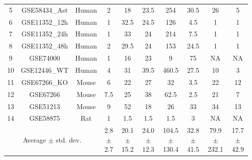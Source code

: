 \documentclass[Minh_PhD_thesis.tex]{subfiles}
\begin{document}
\begin{table}
\begin{center}
\begin{tabular}{ ccc|ccccccc }
5	& GSE58434\_Ast& Human &	\cellcolor{green}2	&	18	&	23.5	&	254	&	30.5	&	26 & 5\\ 

6	& GSE11352\_12h & Human	&	\cellcolor{green}1	&	32.5	&	24.5	&	126	&	4.5	&	\cellcolor{green}1 & \cellcolor{green}1\\ 

7	& GSE11352\_24h & Human	&	\cellcolor{green}1	&	33	&	24	&	214	&	7.5	&	\cellcolor{green}1 & \cellcolor{green}1\\ 

8	& GSE11352\_48h & Human	&	2	&	29.5	&	24	&	153	&	24.5	&	\cellcolor{green}1 & \cellcolor{green}1\\ 

9	& GSE74000 & Human	&	\cellcolor{green}1	&	16	&	23	&	9	&	75	&	\cellcolor{red}NA & \cellcolor{red}NA\\ 

10	& GSE12446\_WT & Human	&	4	&	31	&	39.5	&	460.5	&	27.5	& 10 & 	\cellcolor{green}3\\ 

11	& GSE67266\_KO	& Mouse	&	6	&	22	&	27	&	32	&	\cellcolor{green}3.5	&	22 & 12\\ 

12	& GSE67266&	Mouse	&	7.5	&	25	&	38	&	62.5	&	\cellcolor{green}2.5	&	21 & 7\\ 

13	& GSE51213	& Mouse	&	\cellcolor{green}9	&	52	&	18	&	26	&	33	&	34 & 13\\ 

14	& GSE58875	& Rat 	&	\cellcolor{green}1	&	1.5	&	1.5	&	1.5	&	3	&	\cellcolor{red}NA & \cellcolor{red}NA\\ 
 \hline \hline
 \multicolumn{3}{c}{Average $\pm$ std. dev. }	 &\cellcolor{green} \makecell{2.8\\ $\pm$ 2.7 }	&	 \makecell{20.1\\ $\pm$ 15.2  }	&	 \makecell{24.0\\ $\pm$  12.3}	&	 \makecell{104.5\\ $\pm$    130.4 }	&	 \makecell{ 32.8 \\ $\pm$  41.5 }&	 \makecell{79.9\\ $\pm$ 232.1  }&  \makecell{17.7\\ $\pm$  42.9}\\ 

\end{tabular}

\end{center}
\end{table}
\end{document}
